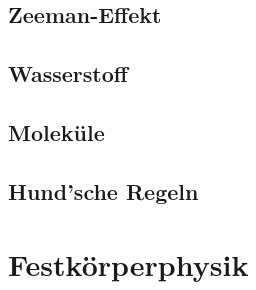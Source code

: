 \documentclass[12pt,a4paper]{article}
\renewcommand{\=}[1]{\stackrel{#1}{=}}
\theoremstyle{definition}
\theoremstyle{remark}
\begin{document}
\subsection{Zeeman-Effekt}

\subsection{Wasserstoff}

\subsection{Moleküle}

\subsection{Hund'sche Regeln}










\newpage
\section{Festkörperphysik}
\end{document}

